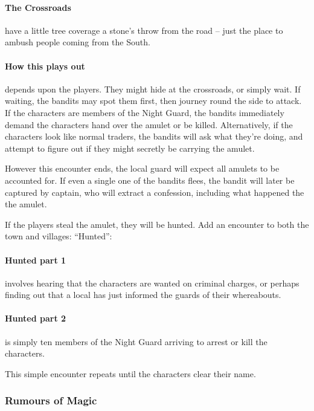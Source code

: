 \paragraph{The Crossroads} have a little tree coverage a stone's throw from the road -- just the place to ambush people coming from the South.

\paragraph{How this plays out} depends upon the players.  They might hide at the crossroads, or simply wait.  If waiting, the bandits may spot them first, then journey round the side to attack.  If the characters are members of the Night Guard, the bandits immediately demand the characters hand over the amulet or be killed.  Alternatively, if the characters look like normal traders, the bandits will ask what they're doing, and attempt to figure out if they might secretly be carrying the amulet.


\humansoldier

However this encounter ends, the local guard will expect all amulets to be accounted for.  If even a single one of the bandits flees, the bandit will later be captured by \gls{captain}, who will extract a confession, including what happened the the amulet.

If the players steal the amulet, they will be hunted.  Add an encounter to both the town and villages: ``Hunted'':

\paragraph{Hunted part 1} involves hearing that the characters are wanted on criminal charges, or perhaps finding out that a local has just informed the guards of their whereabouts.

\paragraph{Hunted part 2} is simply ten members of the Night Guard arriving to arrest or kill the characters.

This simple encounter repeats until the characters clear their name.

\subsubsection{Rumours of Magic}

